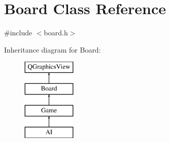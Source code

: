 \hypertarget{class_board}{\section{Board Class Reference}
\label{class_board}
}


{\ttfamily \#include $<$board.\-h$>$}

Inheritance diagram for Board\-:\begin{figure}[H]
\begin{center}
\leavevmode
\includegraphics[height=4.000000cm]{class_board}
\end{center}
\end{figure}
